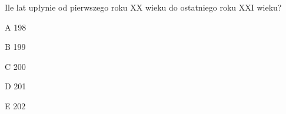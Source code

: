 \begin{tresc}
Ile lat upłynie od pierwszego roku XX wieku do ostatniego roku XXI wieku?
\end{tresc}
\begin{wariant}{A} 198 \end{wariant}
\begin{wariant}{B} 199 \end{wariant}
\begin{wariant}{C} 200 \end{wariant}
\begin{wariant}{D} 201 \end{wariant}
\begin{wariant}{E} 202 \end{wariant}
